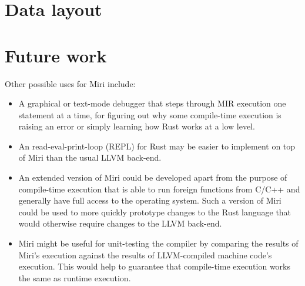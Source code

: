 \documentclass[twocolumn]{article}
\begin{document}
\blindtext

\section{Data layout}


\section{Future work}

Other possible uses for Miri include:

\begin{itemize}
  \item A graphical or text-mode debugger that steps through MIR execution one statement at a time,
    for figuring out why some compile-time execution is raising an error or simply learning how Rust
    works at a low level.
  \item An read-eval-print-loop (REPL) for Rust may be easier to implement on top of Miri than the
    usual LLVM back-end.
  \item An extended version of Miri could be developed apart from the purpose of compile-time
    execution that is able to run foreign functions from C/C++ and generally have full access to the
    operating system. Such a version of Miri could be used to more quickly prototype changes to the
    Rust language that would otherwise require changes to the LLVM back-end.
  \item Miri might be useful for unit-testing the compiler by comparing the results of Miri's
    execution against the results of LLVM-compiled machine code's execution. This would help to
    guarantee that compile-time execution works the same as runtime execution.
\end{itemize}
\end{document}
